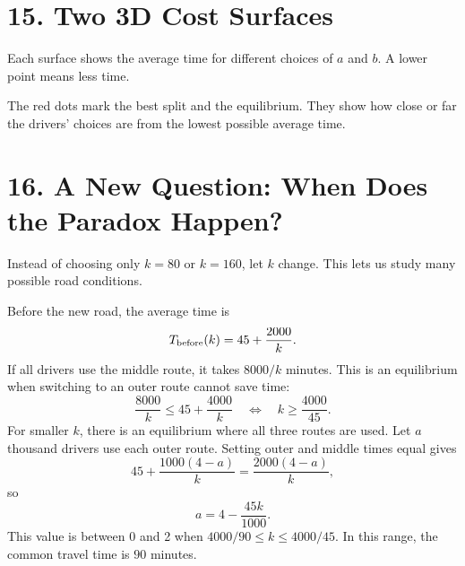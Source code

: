 \documentclass[11pt,a4paper]{article}
\newcommand{\sectiontitle}[1]{\section*{\color{navy}#1}}
\begin{document}
\sectiontitle{15. Two 3D Cost Surfaces}
Each surface shows the average time for different choices of $a$ and $b$. A lower point means less time.
\begin{center}\end{center}
\begin{center}\end{center}
The red dots mark the best split and the equilibrium. They show how close or far the drivers' choices are from the lowest possible average time.

\sectiontitle{16. A New Question: When Does the Paradox Happen?}
Instead of choosing only $k=80$ or $k=160$, let $k$ change. This lets us study many possible road conditions.

Before the new road, the average time is
\[T_{\rm before}(k)=45+\frac{2000}{k}.\]
If all drivers use the middle route, it takes $8000/k$ minutes. This is an equilibrium when switching to an outer route cannot save time:
\[\frac{8000}{k}\leq45+\frac{4000}{k}\quad\Longleftrightarrow\quad k\geq\frac{4000}{45}.\]
For smaller $k$, there is an equilibrium where all three routes are used. Let $a$ thousand drivers use each outer route. Setting outer and middle times equal gives
\[45+\frac{1000(4-a)}{k}=\frac{2000(4-a)}{k},\]
so
\[a=4-\frac{45k}{1000}.\]
This value is between 0 and 2 when $4000/90\leq k\leq4000/45$. In this range, the common travel time is $90$ minutes.
\end{document}
